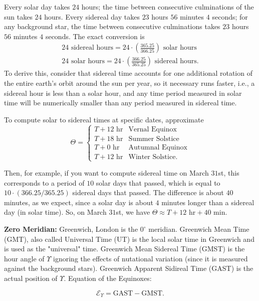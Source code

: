 \documentclass[11pt]{article}
\newcommand{\V}{

\vspace{\baselineskip}

}
\begin{document}
Every solar day takes $24$ hours; the time between consecutive culminations of the sun takes $24$ hours. Every sidereal day takes $23$ hours $56$ minutes $4$ seconds; for any background star, the time between consecutive culminations takes $23$ hours $56$ minutes $4$ seconds. The exact conversion is 
\begin{gather*}
    24\text{ sidereal hours} = 24\cdot \left(\frac{365.25}{366.25}\right)\text{ solar hours} \\
    24\text{ solar hours} = 24\cdot \left(\frac{366.25}{365.25}\right)\text{ sidereal hours}. 
\end{gather*}
To derive this, consider that sidereal time accounts for one additional rotation of the entire earth's orbit around the sun per year, so it necessary runs faster, i.e., a sidereal hour is less than a solar hour, and any time period measured in solar time will be numerically smaller than any period measured in sidereal time.\V

To compute solar to sidereal times at specific dates, approximate 
\[
\Theta = \begin{cases}
    T + 12\text{ hr} & \text{Vernal Equinox} \\
    T + 18\text{ hr} & \text{Summer Solstice} \\
    T + 0\text{ hr} & \text{Autumnal Equinox} \\
    T + 12\text{ hr} & \text{Winter Solstice}. 
\end{cases}
\]

Then, for example, if you want to compute sidereal time on March $31$st, this corresponds to a period of $10$ solar days that passed, which is equal to $10\cdot (366.25/365.25)$ sidereal days that passed. The difference is about $40$ minutes, as we expect, since a solar day is about $4$ minutes longer than a sidereal day (in solar time). So, on March $31$st, we have $\Theta \approx T + 12\text{ hr} + 40\text{ min}$.\V

\textbf{Zero Meridian:} Greenwich, London is the $0^{\circ}$ meridian. Greenwich Mean Time (GMT), also called Universal Time (UT) is the local solar time in Greenwich and is used as the "universal" time. Greenwich Mean Sidereal Time (GMST) is the hour angle of $\Upsilon$ ignoring the effects of nutational variation (since it is measured against the background stars). Greenwich Apparent Sidireal Time (GAST) is the actual position of $\Upsilon$. Equation of the Equinoxes: 

\begin{equation*}
    \mathcal{E}_{\Upsilon} = \text{GAST} - \text{GMST}.
\end{equation*}
\end{document}
